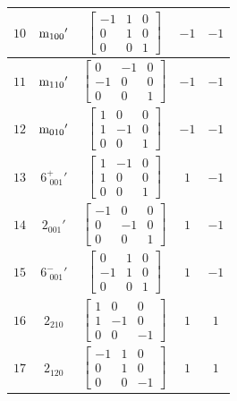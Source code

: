 \documentclass[fleqn,8pt]{jsarticle}
\begin{document}
\begin{longtable}{ccccc}
$ 10 $ & $ {\rm m}_{100}{}' $ & $ \begin{bmatrix} -1 & 1 & 0 \\ 0 & 1 & 0 \\ 0 & 0 & 1 \end{bmatrix} $ & $ -1 $ & $ -1 $ \\ \hline
$ 11 $ & $ {\rm m}_{110}{}' $ & $ \begin{bmatrix} 0 & -1 & 0 \\ -1 & 0 & 0 \\ 0 & 0 & 1 \end{bmatrix} $ & $ -1 $ & $ -1 $ \\ \hline
$ 12 $ & $ {\rm m}_{010}{}' $ & $ \begin{bmatrix} 1 & 0 & 0 \\ 1 & -1 & 0 \\ 0 & 0 & 1 \end{bmatrix} $ & $ -1 $ & $ -1 $ \\ \hline
$ 13 $ & $ 6^{+}_{\,\,001}{}' $ & $ \begin{bmatrix} 1 & -1 & 0 \\ 1 & 0 & 0 \\ 0 & 0 & 1 \end{bmatrix} $ & $ 1 $ & $ -1 $ \\ \hline
$ 14 $ & $ 2{}_{001}{}' $ & $ \begin{bmatrix} -1 & 0 & 0 \\ 0 & -1 & 0 \\ 0 & 0 & 1 \end{bmatrix} $ & $ 1 $ & $ -1 $ \\ \hline
$ 15 $ & $ 6^{-}_{\,\,001}{}' $ & $ \begin{bmatrix} 0 & 1 & 0 \\ -1 & 1 & 0 \\ 0 & 0 & 1 \end{bmatrix} $ & $ 1 $ & $ -1 $ \\ \hline
$ 16 $ & $ 2{}_{210} $ & $ \begin{bmatrix} 1 & 0 & 0 \\ 1 & -1 & 0 \\ 0 & 0 & -1 \end{bmatrix} $ & $ 1 $ & $ 1 $ \\ \hline
$ 17 $ & $ 2{}_{120} $ & $ \begin{bmatrix} -1 & 1 & 0 \\ 0 & 1 & 0 \\ 0 & 0 & -1 \end{bmatrix} $ & $ 1 $ & $ 1 $ \\ \hline

\end{longtable}
\end{document}
